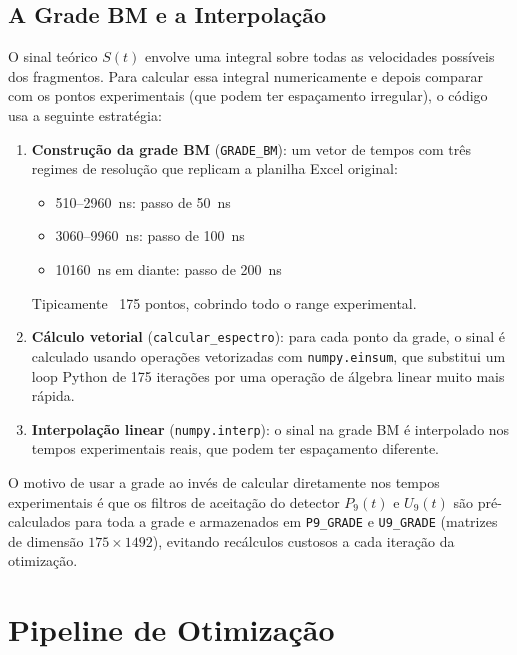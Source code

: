 \documentclass[12pt,a4paper]{report}
\newcommand{\code}[1]{\texttt{#1}}
\begin{document}
\section{A Grade BM e a Interpolação}

O sinal teórico $S(t)$ envolve uma integral sobre todas as velocidades
possíveis dos fragmentos. Para calcular essa integral numericamente e
depois comparar com os pontos experimentais (que podem ter espaçamento
irregular), o código usa a seguinte estratégia:

\begin{enumerate}
  \item \textbf{Construção da grade BM} (\code{GRADE\_BM}): um vetor de tempos
    com três regimes de resolução que replicam a planilha Excel original:
    \begin{itemize}
      \item 510–2960~ns: passo de 50~ns
      \item 3060–9960~ns: passo de 100~ns
      \item 10160~ns em diante: passo de 200~ns
    \end{itemize}
    Tipicamente ~175 pontos, cobrindo todo o range experimental.

  \item \textbf{Cálculo vetorial} (\code{calcular\_espectro}): para cada ponto
    da grade, o sinal é calculado usando operações vetorizadas com
    \texttt{numpy.einsum}, que substitui um loop Python de 175 iterações
    por uma operação de álgebra linear muito mais rápida.

  \item \textbf{Interpolação linear} (\code{numpy.interp}): o sinal na grade
    BM é interpolado nos tempos experimentais reais, que podem ter
    espaçamento diferente.
\end{enumerate}

O motivo de usar a grade ao invés de calcular diretamente nos tempos
experimentais é que os filtros de aceitação do detector $P_9(t)$ e $U_9(t)$
são pré-calculados para toda a grade e armazenados em \code{P9\_GRADE} e
\code{U9\_GRADE} (matrizes de dimensão $175 \times 1492$), evitando
recálculos custosos a cada iteração da otimização.


\chapter{Pipeline de Otimização}
\label{cap:otimizacao}
\end{document}
